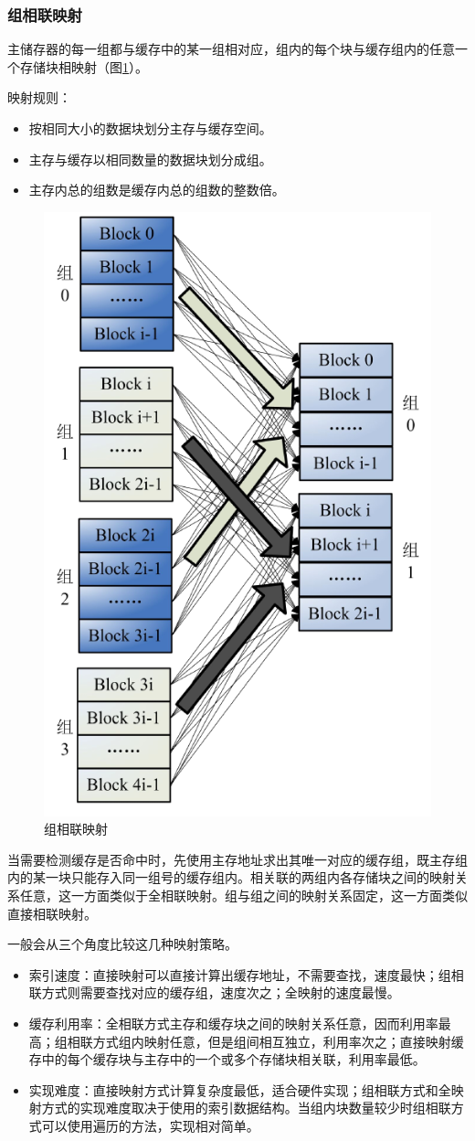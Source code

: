 \subsubsection{组相联映射}

主储存器的每一组都与缓存中的某一组相对应，组内的每个块与缓存组内的任意一个存储块相映射（图\ref{fig:cache-map-3}）。

映射规则：
\begin{itemize}
\item 按相同大小的数据块划分主存与缓存空间。
\item 主存与缓存以相同数量的数据块划分成组。
\item 主存内总的组数是缓存内总的组数的整数倍。
\end{itemize}

\begin{figure}[H]
\centering
\includegraphics[width=0.4\linewidth]{./graph/cache-map-3}
\caption{组相联映射}
\label{fig:cache-map-3}
\end{figure}

当需要检测缓存是否命中时，先使用主存地址求出其唯一对应的缓存组，既主存组内的某一块只能存入同一组号的缓存组内。相关联的两组内各存储块之间的映射关系任意，这一方面类似于全相联映射。组与组之间的映射关系固定，这一方面类似直接相联映射。

一般会从三个角度比较这几种映射策略。
\begin{itemize}
\item 索引速度：直接映射可以直接计算出缓存地址，不需要查找，速度最快；组相联方式则需要查找对应的缓存组，速度次之；全映射的速度最慢。
\item
缓存利用率：全相联方式主存和缓存块之间的映射关系任意，因而利用率最高；组相联方式组内映射任意，但是组间相互独立，利用率次之；直接映射缓存中的每个缓存块与主存中的一个或多个存储块相关联，利用率最低。
\item
实现难度：直接映射方式计算复杂度最低，适合硬件实现；组相联方式和全映射方式的实现难度取决于使用的索引数据结构。当组内块数量较少时组相联方式可以使用遍历的方法，实现相对简单。
\end{itemize}

